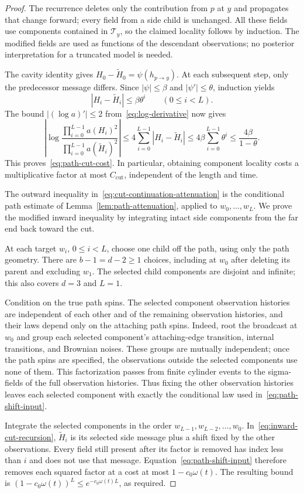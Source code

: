 \begin{proof}
The recurrence deletes only the contribution from $p$ at $y$ and
propagates that change forward; every field from a side child is unchanged.
All these fields use components contained in $\mathcal T_y$, so the
claimed locality follows by induction.  The modified fields are used
as functions of the descendant observations; no posterior
interpretation for a truncated model is needed.

The cavity identity gives
$H_0-\widetilde H_0=\psi(h_{p\to y})$.  At each subsequent step, only
the predecessor message differs.  Since $|\psi|\le\beta$ and
$|\psi'|\le\theta$, induction yields
\[
 |H_i-\widetilde H_i|\le\beta\theta^i\qquad(0\le i<L).
\]
The bound $|(\log a)'|\le2$ from~\eqref{eq:log-derivative} now gives
\[
 \left|\log
   \frac{\prod_{i=0}^{L-1}a(H_i)^2}
        {\prod_{i=0}^{L-1}a(\widetilde H_i)^2}\right|
 \le4\sum_{i=0}^{L-1}|H_i-\widetilde H_i|
 \le4\beta\sum_{i=0}^{L-1}\theta^i
 \le\frac{4\beta}{1-\theta}.
\]
This proves~\eqref{eq:path-cut-cost}.  In particular, obtaining
component locality costs a multiplicative factor at most
$C_{\mathrm{cut}}$, independent of the length and time.

The outward inequality in~\eqref{eq:cut-continuation-attenuation}
is the conditional path estimate of Lemma~\ref{lem:path-attenuation},
applied to $w_0,\ldots,w_L$.  We prove the modified inward inequality
by integrating intact side components from the far end back toward the cut.

At each target $w_i$, $0\le i<L$, choose one child off the path,
using only the path geometry.  There are $b-1=d-2\ge1$ choices,
including at $w_0$ after deleting its parent and excluding $w_1$.
The selected child components are disjoint and infinite; this also
covers $d=3$ and $L=1$.

Condition on the true path spins.  The selected component observation
histories are independent of each other and of the remaining
observation histories, and their laws depend only on the attaching
path spins.  Indeed, root the broadcast at $w_0$ and group each
selected component's attaching-edge transition, internal transitions,
and Brownian noises.  These groups are mutually independent; once
the path spins are specified, the observations outside the selected
components use none of them.  This factorization passes from finite
cylinder events to the sigma-fields of the full observation histories.
Thus fixing the other observation histories leaves each selected
component with exactly the conditional law used
in~\eqref{eq:path-shift-input}.

Integrate the selected components in the order
$w_{L-1},w_{L-2},\ldots,w_0$.  In~\eqref{eq:inward-cut-recursion},
$\widetilde H_i$ is its selected side message plus a shift fixed by
the other observations.  Every field still present after its factor
is removed has index less than $i$ and does not use that message.
Equation~\eqref{eq:path-shift-input} therefore removes each squared
factor at a cost at most $1-c_0\omega(t)$.  The resulting bound is
$(1-c_0\omega(t))^L\le e^{-c_0\omega(t)L}$, as required.
\end{proof}

